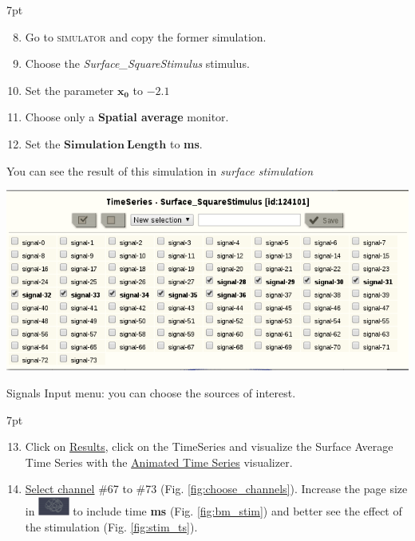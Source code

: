 \documentclass{tufte-handout}
\newenvironment{simulation}{%
  \def\FrameCommand{%
    \hspace{1pt}%
    {\color{ForestGreen}\vrule width 2pt}%
    {\color{simulationshade}\vrule width 4pt}%
    \colorbox{simulationshade}%
  }%
  \MakeFramed{\advance\hsize-\width\FrameRestore}%
  \noindent\hspace{-4.55pt}%
  \begin{adjustwidth}{}{7pt}%
  \vspace{2pt}\vspace{2pt}%
}
{%
  \vspace{2pt}\end{adjustwidth}\endMakeFramed%
}
\begin{document}
  \begin{simulation}
  \begin{enumerate}
  \setcounter{enumi}{7}
  \item Go to \textsc{simulator} and copy the former simulation.
  \item Choose the \textit{Surface\_SquareStimulus} stimulus.
  \item Set the parameter $\mathbf{x_0}$ to $\mathbf{-2.1}$
  \item Choose only a \textbf{Spatial average} monitor.
  \item Set the $\mathbf{Simulation\:Length}$ to \textbf{\unit[4000]{ms}}.
 
\end{enumerate}
\end{simulation}


You can see the result of this simulation in \textit{surface stimulation}

\begin{marginfigure}
  \includegraphics[width=\linewidth]{Handout_UI_ModellingAnEpilepticPatient_ChooseChannelsStimulation}%
  \caption{Signals Input menu: you can choose the sources of interest.}%
  \label{fig:choose_channels}%
\end{marginfigure}


  \begin{simulation}
  \begin{enumerate}
  \setcounter{enumi}{12}
  \item Click on \underline{Results}, click on the TimeSeries and visualize the Surface Average Time Series with 
  the \underline{Animated Time Series} visualizer.
  \item \underline{Select channel} \#67 to \#73 (Fig. \ref{fig:choose_channels}). Increase the page size in \includegraphics[width=0.08\textwidth]{butt_brain_menu} to include time \textbf{\unit[2000]{ms}}
  (Fig. \ref{fig:bm_stim}) and better see the effect of the stimulation (Fig. \ref{fig:stim_ts}).
 
\end{enumerate}
\end{simulation}
\end{document}
